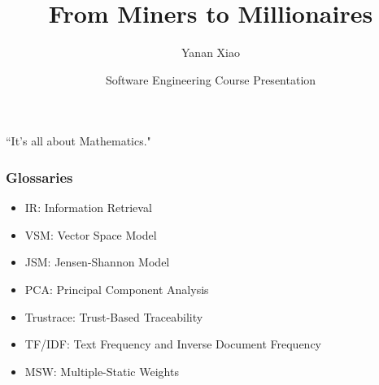 \documentclass[12pt,hyperref=true,mathserif]{beamer}
\begin{document}
\title[Miners to Millionaires]{From Miners to Millionaires}
\author{Yanan Xiao}
\date[CIS502 Presentation]{Software Engineering Course Presentation}

\begin{frame}
\titlepage
\end{frame}

\begin{frame}
\tableofcontents
\end{frame}

\begin{frame}
\centering
``It's all about Mathematics."
\end{frame}

\begin{frame}
\frametitle{Glossaries}
\begin{itemize}
  \item IR: Information Retrieval\\[6pt]
  \item VSM: Vector Space Model\\[6pt]
  \item JSM: Jensen-Shannon Model\\[6pt]
  \item PCA: Principal Component Analysis\\[6pt]
  \item Trustrace: Trust-Based Traceability\\[6pt]
  \item TF/IDF: Text Frequency and Inverse Document Frequency\\[6pt]
  \item MSW: Multiple-Static Weights\\[8pt]
\end{itemize}
\end{frame}
\end{document}
